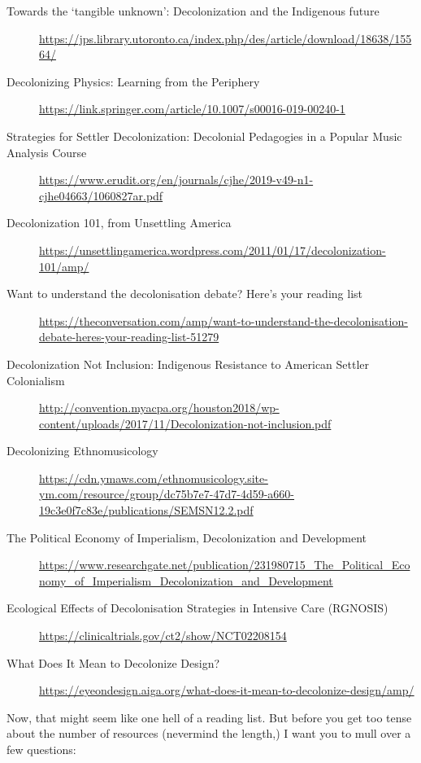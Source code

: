 \documentclass[11pt]{article}
\begin{document}
\begin{itemize}
\begin{description}
\item[{Towards the ‘tangible unknown’: Decolonization and the Indigenous future}] \url{https://jps.library.utoronto.ca/index.php/des/article/download/18638/15564/}

\item[{Decolonizing Physics: Learning from the Periphery}] \url{https://link.springer.com/article/10.1007/s00016-019-00240-1}

\item[{Strategies for Settler Decolonization: Decolonial Pedagogies in a Popular Music Analysis Course}] \url{https://www.erudit.org/en/journals/cjhe/2019-v49-n1-cjhe04663/1060827ar.pdf}

\item[{Decolonization 101, from Unsettling America}] \url{https://unsettlingamerica.wordpress.com/2011/01/17/decolonization-101/amp/}

\item[{Want to understand the decolonisation debate? Here's your reading list}] \url{https://theconversation.com/amp/want-to-understand-the-decolonisation-debate-heres-your-reading-list-51279}

\item[{Decolonization Not Inclusion: Indigenous Resistance to American Settler Colonialism}] \url{http://convention.myacpa.org/houston2018/wp-content/uploads/2017/11/Decolonization-not-inclusion.pdf}

\item[{Decolonizing Ethnomusicology}] \url{https://cdn.ymaws.com/ethnomusicology.site-ym.com/resource/group/dc75b7e7-47d7-4d59-a660-19c3e0f7c83e/publications/SEMSN12.2.pdf}

\item[{The Political Economy of Imperialism, Decolonization and Development}] \url{https://www.researchgate.net/publication/231980715\_The\_Political\_Economy\_of\_Imperialism\_Decolonization\_and\_Development}

\item[{Ecological Effects of Decolonisation Strategies in Intensive Care (RGNOSIS)}] \url{https://clinicaltrials.gov/ct2/show/NCT02208154}

\item[{What Does It Mean to Decolonize Design?}] \url{https://eyeondesign.aiga.org/what-does-it-mean-to-decolonize-design/amp/}
\end{description}

Now, that might seem like one hell of a reading list. But before you get too tense about the number of resources (nevermind the length,) I want you to mull over a few questions:


\end{itemize}
\end{document}
